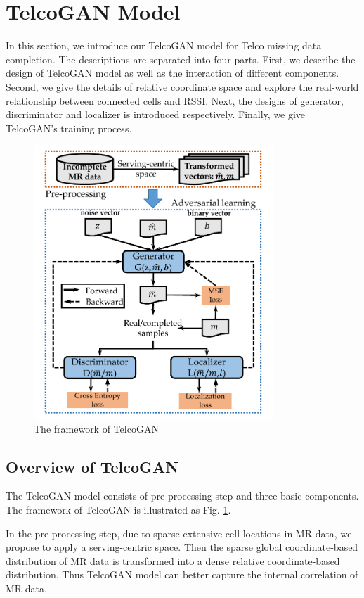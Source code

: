 \section{TelcoGAN Model}
In this section, we introduce our TelcoGAN model for Telco missing data completion. The descriptions are separated into four parts. First, we describe the design of TelcoGAN model as well as the interaction of different components. Second, we give the details of relative coordinate space and explore the real-world relationship between connected cells and RSSI. Next, the designs of generator, discriminator and localizer is introduced respectively. Finally, we give TelcoGAN's training process.

\begin{figure}
  \centering
  \includegraphics[width=9cm]{pics/framework.pdf}
  \caption{The framework of TelcoGAN}\label{fig:framework}
\end{figure}


\subsection{Overview of TelcoGAN}
The TelcoGAN model consists of pre-processing step and three basic components. The framework of TelcoGAN is illustrated as Fig. \ref{fig:framework}.

In the pre-processing step, due to sparse extensive cell locations in MR data, we propose to apply a serving-centric space. Then the sparse global coordinate-based distribution of MR data is transformed into a dense relative coordinate-based distribution. Thus TelcoGAN model can better capture the internal correlation of MR data.

